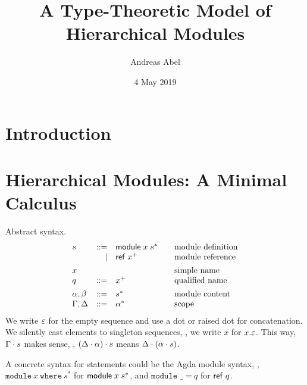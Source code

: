 \documentclass{article}
\title{A Type-Theoretic Model of Hierarchical Modules}
\author{Andreas Abel}
\date{4 May 2019}
\theoremstyle{definition}
\theoremstyle{plain}
\theoremstyle{remark}
\begin{document}
\maketitle

\begin{abstract}
\end{abstract}

\section{Introduction}
\label{sec:intro}

\section{Hierarchical Modules: A Minimal Calculus}

Abstract syntax.
\[
\begin{array}{lrl@{\qquad}l}
  s & ::=  & \mdef x {s^*}    & \mbox{module definition} \\
    & \mid & \mref {x^+}      & \mbox{module reference}  \\[1ex]
  x &  &                      & \mbox{simple name}       \\
  q & ::=  & x^+              & \mbox{qualified name}    \\[1ex]
  \alpha,\beta  & ::= & s^*   & \mbox{module content}    \\
  \Gamma,\Delta & ::= & \Ga^* & \mbox{scope}             \\
\end{array}
\]
We write $\varepsilon$ for the empty sequence and use a dot or raised dot for
concatenation.  We silently cast elements to singleton sequences, \eg,
we write $x$ for $x.\varepsilon$.  This way, $\Gamma \cdot s$ makes sense, \eg,
$(\Delta \cdot \alpha) \cdot s$ means $\Delta \cdot (\alpha \cdot s)$.

A concrete syntax for statements could be the Agda module syntax, \ie,
$\texttt{module}~x~\texttt{where}~s^*$ for $\mathsf{module}\;x\;s^*$, and
$\texttt{module~\_~=}~q$ for $\mathsf{ref}\;q$.
\end{document}
